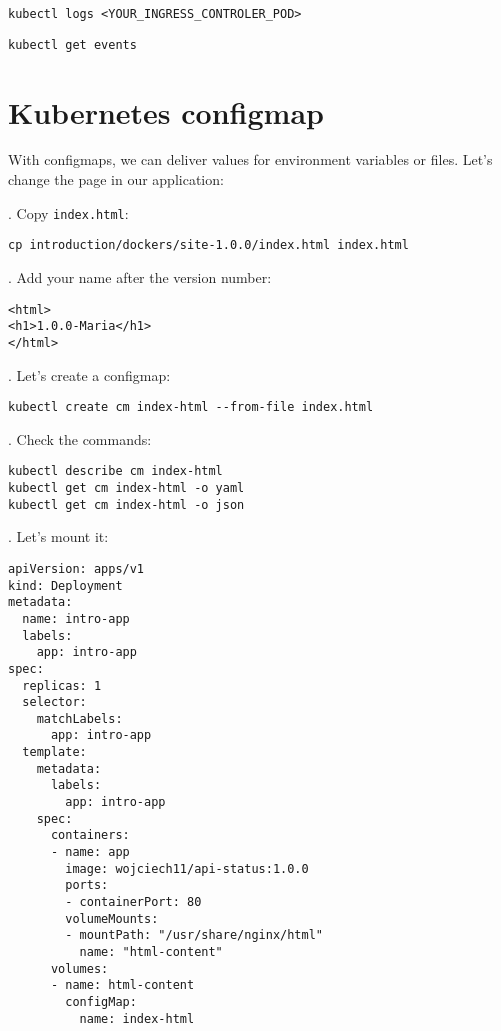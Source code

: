 \documentclass[12pt, letterpaper]{article}
\begin{document}
\begin{verbatim}
kubectl logs <YOUR_INGRESS_CONTROLER_POD>
\end{verbatim}

\begin{verbatim}
kubectl get events
\end{verbatim}

%
%
%
\section{Kubernetes configmap}

With configmaps, we can deliver values for environment variables or files. Let's change the page in our application:

. Copy \verb|index.html|:

\begin{verbatim}
cp introduction/dockers/site-1.0.0/index.html index.html
\end{verbatim}

. Add your name after the version number:

\begin{verbatim}
<html>
<h1>1.0.0-Maria</h1>
</html>
\end{verbatim}

. Let's create a configmap:

\begin{verbatim}
kubectl create cm index-html --from-file index.html
\end{verbatim}

. Check the commands:

\begin{verbatim}
kubectl describe cm index-html
kubectl get cm index-html -o yaml
kubectl get cm index-html -o json
\end{verbatim}

. Let's mount it:

\begin{verbatim}
apiVersion: apps/v1
kind: Deployment
metadata:
  name: intro-app
  labels:
    app: intro-app
spec:
  replicas: 1
  selector:
    matchLabels:
      app: intro-app
  template:
    metadata:
      labels:
        app: intro-app
    spec:
      containers:
      - name: app
        image: wojciech11/api-status:1.0.0
        ports:
        - containerPort: 80
        volumeMounts:
        - mountPath: "/usr/share/nginx/html"
          name: "html-content"
      volumes:
      - name: html-content
        configMap:
          name: index-html
\end{verbatim}
\end{document}

